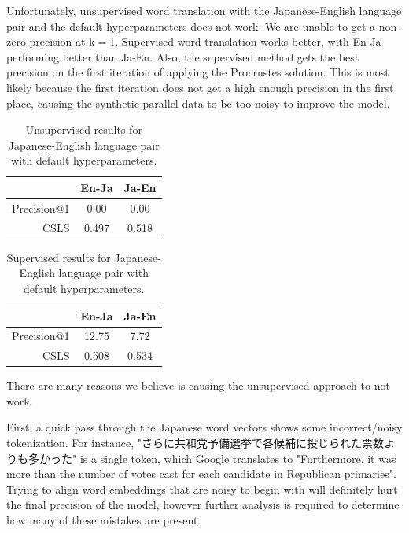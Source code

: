 \documentclass{article}
\begin{document}
Unfortunately, unsupervised word translation with the Japanese-English language
pair and the default hyperparameters does not work. We are unable to get a
non-zero precision at $\text{k}=1$. Supervised word translation works better,
with En-Ja performing better than Ja-En. Also, the supervised method gets the best
precision on the first iteration of applying the Procrustes solution. This is most
likely because the first iteration does not get a high enough precision in the 
first place, causing the synthetic parallel data to be too noisy to improve the
model.

\begin{table}[h]
  \centering
  \begin{tabular}{r| c | c}
    \toprule
    & En-Ja & Ja-En \\
    \midrule
    Precision@1 &  0.00 &  0.00 \\
    CSLS        & 0.497 & 0.518 \\
    \bottomrule
  \end{tabular}
  \caption{Unsupervised results for Japanese-English language pair with default hyperparameters.}
\end{table}

\begin{table}[h]
  \centering
  \begin{tabular}{r| c | c}
    \toprule
    & En-Ja & Ja-En \\
    \midrule
    Precision@1 & 12.75 &  7.72 \\
    CSLS        & 0.508 & 0.534 \\
    \bottomrule
  \end{tabular}
  \caption{Supervised results for Japanese-English language pair with default hyperparameters.}
\end{table}

\noindent
There are many reasons we believe is causing the unsupervised approach to not work.

First, a quick pass through the Japanese word vectors shows some incorrect/noisy
tokenization. For instance, "さらに共和党予備選挙で各候補に投じられた票数よりも多かった"
is a single token, which Google translates to "Furthermore, it was more than
the number of votes cast for each candidate in Republican primaries". Trying to
align word embeddings that are noisy to begin with will definitely hurt the final
precision of the model, however further analysis is required to determine how
many of these mistakes are present.
\end{document}
